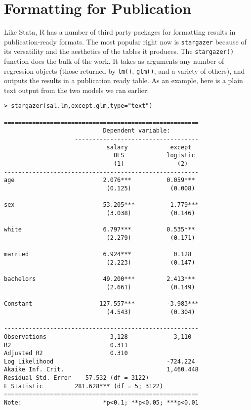 \documentclass[12pt, oneside]{amsart}   	%
\begin{document}
\section{Formatting for Publication}

Like Stata, R has a number of third party packages for formatting results in publication-ready formats. The most popular right now is \texttt{stargazer} because of its versatility and the aesthetics of the tables it produces. The \texttt{stargazer()} function does the bulk of the work. It takes as arguments any number of regression objects (those returned by \texttt{lm()}, \texttt{glm()}, and a variety of others), and outputs the results in a publication ready table. As an example, here is a plain text output from the two models we ran earlier:

\begin{verbatim}
> stargazer(sal.lm,except.glm,type="text")

=======================================================
                            Dependent variable:        
                    -----------------------------------
                             salary            except  
                               OLS            logistic 
                               (1)               (2)   
-------------------------------------------------------
age                         2.076***          0.059*** 
                             (0.125)           (0.008) 
                                                       
sex                        -53.205***         -1.779***
                             (3.038)           (0.146) 
                                                       
white                       6.797***          0.535*** 
                             (2.279)           (0.171) 
                                                       
married                     6.924***            0.128  
                             (2.223)           (0.147) 
                                                       
bachelors                   49.200***         2.413*** 
                             (2.661)           (0.149) 
                                                       
Constant                   127.557***         -3.983***
                             (4.543)           (0.304) 
                                                       
-------------------------------------------------------
Observations                  3,128             3,110  
R2                            0.311                    
Adjusted R2                   0.310                    
Log Likelihood                                -724.224 
Akaike Inf. Crit.                             1,460.448
Residual Std. Error    57.532 (df = 3122)              
F Statistic         281.628*** (df = 5; 3122)          
=======================================================
Note:                       *p<0.1; **p<0.05; ***p<0.01
\end{verbatim}
\end{document}
